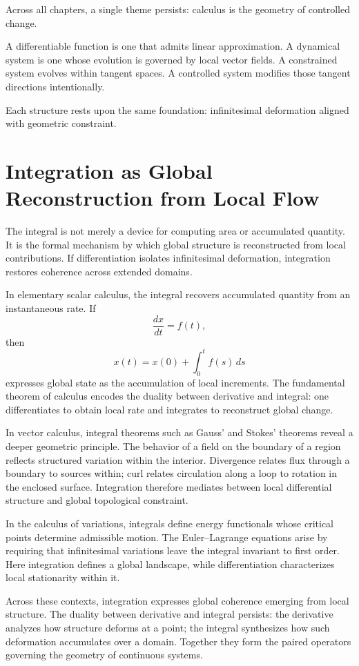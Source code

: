 \documentclass[12pt]{book}
\begin{document}
Across all chapters, a single theme persists: calculus is the geometry of controlled change.

A differentiable function is one that admits linear approximation. A dynamical system is one whose evolution is governed by local vector fields. A constrained system evolves within tangent spaces. A controlled system modifies those tangent directions intentionally.

Each structure rests upon the same foundation: infinitesimal deformation aligned with geometric constraint.

\section{Integration as Global Reconstruction from Local Flow}

The integral is not merely a device for computing area or accumulated
quantity. It is the formal mechanism by which global structure is
reconstructed from local contributions. If differentiation isolates
infinitesimal deformation, integration restores coherence across
extended domains.

In elementary scalar calculus, the integral recovers accumulated
quantity from an instantaneous rate. If
\[
\frac{dx}{dt} = f(t),
\]
then
\[
x(t) = x(0) + \int_0^t f(s)\, ds
\]
expresses global state as the accumulation of local increments.
The fundamental theorem of calculus encodes the duality between
derivative and integral: one differentiates to obtain local rate and
integrates to reconstruct global change.

In vector calculus, integral theorems such as Gauss' and Stokes'
theorems reveal a deeper geometric principle. The behavior of a field
on the boundary of a region reflects structured variation within the
interior. Divergence relates flux through a boundary to sources within;
curl relates circulation along a loop to rotation in the enclosed
surface. Integration therefore mediates between local differential
structure and global topological constraint.

In the calculus of variations, integrals define energy functionals
whose critical points determine admissible motion. The Euler--Lagrange
equations arise by requiring that infinitesimal variations leave the
integral invariant to first order. Here integration defines a global
landscape, while differentiation characterizes local stationarity
within it.

Across these contexts, integration expresses global coherence emerging
from local structure. The duality between derivative and integral
persists: the derivative analyzes how structure deforms at a point;
the integral synthesizes how such deformation accumulates over a
domain. Together they form the paired operators governing the geometry
of continuous systems.
\end{document}
